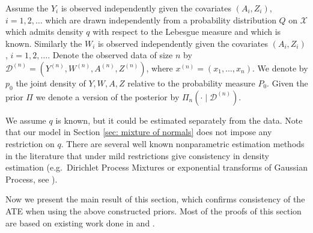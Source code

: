 Assume the $Y_i $ is observed independently given the covariates $ (A_i,Z_i)$, $i=1,2,\ldots$ which are drawn independently from a probability distribution $Q$ on $\mathcal{X}$ which admits density $q$ with respect to the Lebesgue measure and which is known. Similarly the $W_i$ is observed independently given the covariates $ (A_i,Z_i)$, $i=1,2,\ldots$. Denote the observed data of size $n$ by $\mathcal{D}^{(n)} = (Y^{(n)}, W^{(n)}, A^{(n)}, Z^{(n)})$, where $x^{(n)} = (x_1,\ldots,x_n)$. We denote by $p_0$ the joint density of $Y,W,A,Z$ relative to the probability measure $P_0$. Given the prior $\Pi$ we denote a version of the posterior by  $\Pi_n\left(\cdot \mid \mathcal{D}^{(n)} \right)$.

We assume $q$ is known, but it could be estimated separately from the data. Note that our model in Section \ref{sec: mixture of normals} does not impose any restriction on $q$. There are several well known nonparametric estimation methods in the literature that under mild restrictions give consistency in density estimation (e.g.\ Dirichlet Process Mixtures or exponential transforms of Gaussian Process, see \cite{4}). 

Now we present the main result of this section, which confirms consistency of the ATE when using the above constructed priors. Most of the proofs of this section are based on existing work done in \cite{202} and \cite{121}.

